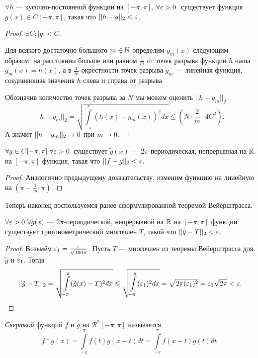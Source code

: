 \begin{Lemma}
    $\forall h$ --- кусочно-постоянной функции на $[-\pi, \pi]$, $ \forall \varepsilon > 0\  $ существует функция $ g(x)\in C[-\pi, \pi]$, такая что $||h-g||_2 < \varepsilon$.
\end{Lemma}
\begin{proof}
    $\exists C: |g| < C.$
    
    Для всякого достаточно большого $m \in \mathbb{N}$ определим $g_m(x)$ следующим образом: на расстоянии больше или равном $\frac{1}{m}$ от точек разрыва функции $h$ наша $g_m(x) = h(x)$, а в  $\frac{1}{m}$-окрестности точек разрыва $g_m$ --- линейная функция, соединяющая значения $h$ слева и справа от разрыва.
    
    Обозначив количество точек разрыва за $N$ мы можем оценить $||h-g_m||_2$
   $$ ||h-g_m||_2 = \sqrt{\int\limits_{-\pi}^{\pi}(h(x)-g_m(x))^2dx}\leq\left(N\cdot\frac{2}{m}\cdot4C^2 \right) .$$
   А значит $||h-g_m||_2\rightarrow0$ при $m \rightarrow 0$.
\end{proof}


\begin{Lemma}
    $\forall g \in C[-\pi, \pi]\ \forall \varepsilon > 0$\ существует $\tilde{g}(x)$ --- $2\pi$-периодическая, непрерывная на $\mathbb{R}$ на $[-\pi, \pi]$ функция, такая что $||f-g||_2 < \varepsilon$.
\end{Lemma}
\begin{proof}
    Аналогично предыдущему доказательству, изменим функцию на линейную на $(\pi- \frac{1}{m}; \pi)$.
\end{proof}
Теперь наконец воспользуемся ранее сформулированной теоремой Вейерштрасса.
\begin{Lemma}
    $\forall \eps > 0\ \forall\tilde{g}(x)$ --- $2\pi$-периодической, непрерывной на $\mathbb{R}$ на $[-\pi, \pi]$ функции существует тригонометрический многочлен $T$, такой что $||\tilde{g}-T||_2 < \varepsilon$.
\end{Lemma}
\begin{proof}
   Возьмём $\varepsilon_1 = \frac{\varepsilon}{\sqrt{100\pi}}$.
   Пусть $T$ --- многочлен из теоремы Вейерштрасса для $\tilde{g}$ и $\varepsilon_1$.
   Тогда $$||\tilde{g}-T||_2=\sqrt{\int\limits_{-\pi}^{\pi}(\tilde{g}(x)-T)^2dx}\leqslant \sqrt{\int\limits_{-\pi}^{\pi}(\varepsilon_1)^2dx} = \sqrt{2\pi(\varepsilon_1)^2}=\varepsilon_1\sqrt{2\pi} < \varepsilon.$$
\end{proof}
\begin{Def}
    \textit{Сверткой} функций $f$ и $g$ на $\mathcal{R}^2[-\pi;\pi]$ называется
	$$
    f*g(x) = \int\limits_{-\pi}^{\pi} f(t)g(x-t)dt = \int\limits_{-\pi}^{\pi}f(x-t)g(t)dt.
    $$
\end{Def}

